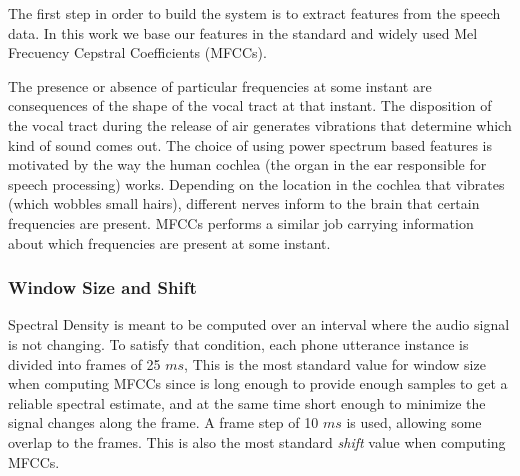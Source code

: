 The first step in order to build the system is to extract features from the speech data. In this
work we base our features in the standard and widely used Mel Frecuency Cepstral Coefficients 
(MFCCs).

The presence or absence of particular frequencies at some instant are consequences of the shape of
the vocal tract at that instant. The disposition of the vocal tract during the 
release of air generates vibrations 
that determine which kind of sound comes out.
The choice of using power spectrum based features is motivated by
the way the human cochlea (the organ in the ear responsible for speech processing) works.
Depending on the location in the cochlea that vibrates (which wobbles small hairs), 
different nerves inform to the brain that certain frequencies are present. 
MFCCs performs a similar job carrying information about which frequencies are present at
some instant. 


\subsubsection{Window Size and Shift}

Spectral Density is meant to be computed over an interval where the audio signal is not changing.
To satisfy that condition, each phone utterance instance is divided into frames of 25 $ms$, 
This is the most standard value for window size when computing MFCCs since is long enough
to provide enough samples to get a reliable spectral estimate, and at the same time short
enough to minimize the signal changes along the frame.
A frame step of 10 $ms$ is used, allowing some overlap to the frames. This is also the most standard
\emph{shift} value when computing MFCCs.

